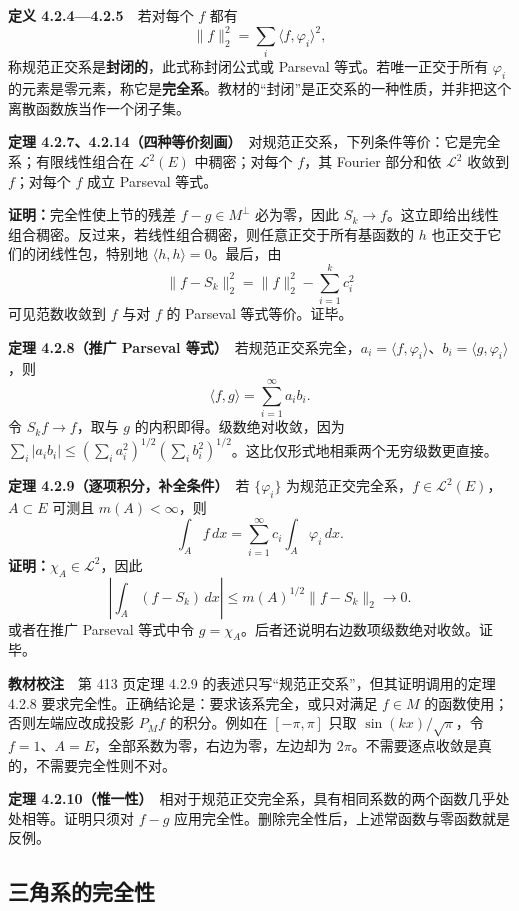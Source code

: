 \documentclass[11pt,a4paper]{article}
\begin{document}
\textbf{定义 4.2.4---4.2.5}　若对每个 \(f\) 都有 \[
\|f\|_2^2=\sum_i\langle f,\varphi_i\rangle^2,
\] 称规范正交系是\textbf{封闭的}，此式称封闭公式或 Parseval
等式。若唯一正交于所有 \(\varphi_i\)
的元素是零元素，称它是\textbf{完全系}。教材的``封闭''是正交系的一种性质，并非把这个离散函数族当作一个闭子集。

\textbf{定理
4.2.7、4.2.14（四种等价刻画）}　对规范正交系，下列条件等价：它是完全系；有限线性组合在
\(\mathcal L^2(E)\) 中稠密；对每个 \(f\)，其 Fourier 部分和依
\(\mathcal L^2\) 收敛到 \(f\)；对每个 \(f\) 成立 Parseval 等式。

\textbf{证明：}完全性使上节的残差 \(f-g\in M^\perp\) 必为零，因此
\(S_k\to f\)。这立即给出线性组合稠密。反过来，若线性组合稠密，则任意正交于所有基函数的
\(h\) 也正交于它们的闭线性包，特别地 \(\langle h,h\rangle=0\)。最后，由
\[
\|f-S_k\|_2^2=\|f\|_2^2-\sum_{i=1}^kc_i^2
\] 可见范数收敛到 \(f\) 与对 \(f\) 的 Parseval 等式等价。证毕。

\textbf{定理 4.2.8（推广 Parseval
等式）}　若规范正交系完全，\(a_i=\langle f,\varphi_i\rangle\)、\(b_i=\langle g,\varphi_i\rangle\)，则
\[
\langle f,g\rangle=\sum_{i=1}^\infty a_ib_i.
\] 令 \(S_kf\to f\)，取与 \(g\) 的内积即得。级数绝对收敛，因为
\(\sum_i|a_ib_i|\le(\sum_ia_i^2)^{1/2}(\sum_ib_i^2)^{1/2}\)。这比仅形式地相乘两个无穷级数更直接。

\textbf{定理 4.2.9（逐项积分，补全条件）}　若 \(\{\varphi_i\}\)
为规范正交完全系，\(f\in\mathcal L^2(E)\)，\(A\subset E\) 可测且
\(m(A)<\infty\)，则 \[
\int_Af\,dx=\sum_{i=1}^\infty c_i\int_A\varphi_i\,dx.
\] \textbf{证明：}\(\chi_A\in\mathcal L^2\)，因此 \[
\left|\int_A(f-S_k)\,dx\right|\le m(A)^{1/2}\|f-S_k\|_2\longrightarrow0.
\] 或者在推广 Parseval 等式中令
\(g=\chi_A\)。后者还说明右边数项级数绝对收敛。证毕。

\textbf{教材校注}　第 413 页定理 4.2.9
的表述只写``规范正交系''，但其证明调用的定理 4.2.8
要求完全性。正确结论是：要求该系完全，或只对满足 \(f\in M\)
的函数使用；否则左端应改成投影 \(P_Mf\) 的积分。例如在 \([-\pi,\pi]\)
只取 \(\sin(kx)/\sqrt\pi\)，令
\(f=1\)、\(A=E\)，全部系数为零，右边为零，左边却为
\(2\pi\)。不需要逐点收敛是真的，不需要完全性则不对。

\textbf{定理
4.2.10（惟一性）}　相对于规范正交完全系，具有相同系数的两个函数几乎处处相等。证明只须对
\(f-g\) 应用完全性。删除完全性后，上述常函数与零函数就是反例。

\subsection{三角系的完全性}\label{ch04-s2-ux4e09ux89d2ux7cfbux7684ux5b8cux5168ux6027}
\end{document}
